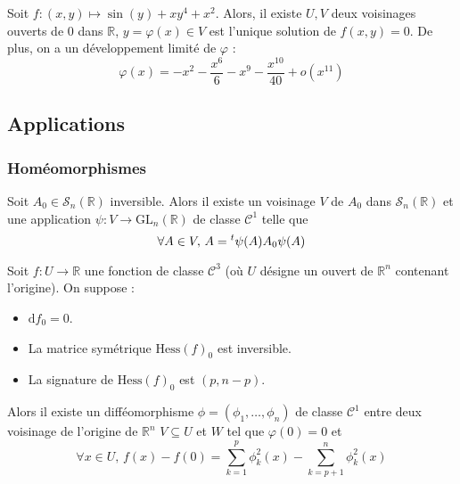 
	\begin{example}
		Soit $f : (x,y) \mapsto \sin(y) + xy^4 + x^2$. Alors, il existe $U, V$ deux voisinages ouverts de $0$ dans $\mathbb{R}$, $y = \varphi(x) \in V$ est l'unique solution de $f(x,y) = 0$. De plus, on a un développement limité de $\varphi$ :
		\[ \varphi(x) = -x^2 - \frac{x^6}{6} - x^9 - \frac{x^{10}}{40} + o(x^{11}) \]
	\end{example}

	\subsection{Applications}

	\subsubsection{Homéomorphismes}


	\begin{lemma}
		Soit $A_0 \in \mathcal{S}_n(\mathbb{R})$ inversible. Alors il existe un voisinage $V$ de $A_0$ dans $\mathcal{S}_n(\mathbb{R})$ et une application $\psi : V \rightarrow \mathrm{GL}_n(\mathbb{R})$ de classe $\mathcal{C}^1$ telle que
		\[ \forall A \in V, \, A = \mathstrut ^t \psi(A) A_0 \psi(A) \]
	\end{lemma}


	\begin{lemma}[Morse]
		Soit $f : U \rightarrow \mathbb{R}$ une fonction de classe $\mathcal{C}^3$ (où $U$ désigne un ouvert de $\mathbb{R}^n$ contenant l'origine). On suppose :
		\begin{itemize}
			\item $\mathrm{d} f_0 = 0$.
			\item La matrice symétrique $\mathrm{Hess} (f)_0$ est inversible.
			\item La signature de $\mathrm{Hess}(f)_0$ est $(p, n-p)$.
		\end{itemize}
		Alors il existe un difféomorphisme $\phi = (\phi_1, \dots, \phi_n)$ de classe $\mathcal{C}^1$ entre deux voisinage de l'origine de $\mathbb{R}^n$ $V \subseteq U$ et $W$ tel que $\varphi(0) = 0$ et
		\[ \forall x \in U, \, f(x) - f(0) = \sum_{k=1}^p \phi_k^2(x) - \sum_{k=p+1}^n \phi_k^2(x) \]
	\end{lemma}


